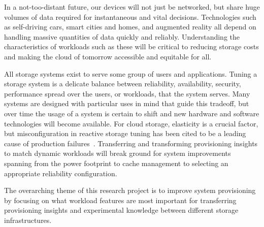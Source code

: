 In a not-too-distant future, our devices will not just be networked, but
share huge volumes of data required for instantaneous and vital decisions.
Technologies such as self-driving cars, smart cities and homes, and augmented
reality all depend on handling massive quantities of data quickly and reliably.
Understanding the characteristics of workloads such as these will be critical to
reducing storage costs and making the cloud of tomorrow accessible and equitable
for all.




All storage systems exist to serve some group of users and applications.
Tuning a storage system is a delicate
balance between reliability, availability, security, performance spread over the
users, or workloads, that the system serves. %
  Many systems are designed with particular uses in mind that guide this
  tradeoff, but over time the usage of a system is certain to shift and new hardware and
  software technologies will become available.
  For cloud storage, elasticity is a
crucial factor, but misconfiguration in reactive storage tuning has been cited
to be a leading cause of production failures~\cite{yin2011empirical}.  
  Transferring and transforming
  provisioning insights to match dynamic workloads will break ground for system
  improvements spanning from the power footprint to cache management to
  selecting an appropriate reliability configuration. 

The overarching theme of this research project is
to improve system provisioning by focusing on what workload features are most important for transferring
provisioning insights and experimental knowledge between different storage infrastructures.



